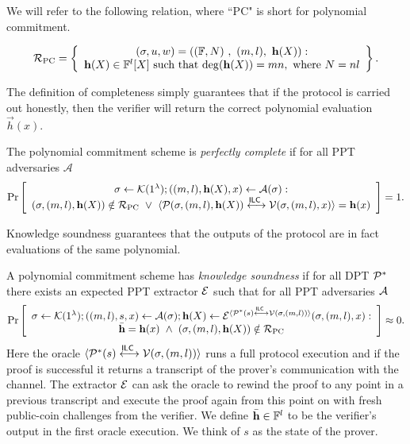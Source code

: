 We will refer to the following relation, where ``PC" is short for polynomial commitment.

$$\mathcal{R}_{\textnormal{PC}}=\left\{\begin{array}{c}
(\mathsf{\sigma},u,w)=\left( (\mathbb{F},N)\ , \  (m,l) , \ \mathbf{h}(X) \right):\\
\mathbf{h}(X) \in \mathbb{F}^l[X] \text{ such that } \mathrm{deg}(\mathbf{h}(X)) = mn, \text{ where } N = nl
\end{array}\right\}.$$

The definition of completeness simply guarantees that if the protocol is carried out honestly, then the verifier will return the correct polynomial evaluation $\vec{h}(x)$.

\begin{definition}
The polynomial commitment scheme is \emph{perfectly complete} if for all PPT adversaries $\mathcal{A}$
$$\Pr \left[ \begin{array}{c} \mathsf{\sigma}\gets \mathcal{K}(1^{\lambda}); ((m,l),\mathbf{h}(X),x) \leftarrow \mathcal{A}(\mathsf{\sigma}): \\
(\mathsf{\sigma},(m,l),\mathbf{h}(X))\notin \mathcal{R}_\mathrm{PC} ~\vee~ \langle \mathcal{P}(\mathsf{\sigma},(m,l),\mathbf{h}(X))\overset{\mathsf{ILC}~}{\longleftrightarrow}\mathcal{V}(\mathsf{\sigma},(m,l),x)\rangle= \mathbf{h}(x) \end{array}\right] =1.$$
\end{definition}

Knowledge soundness guarantees that the outputs of the protocol are in fact evaluations of the same polynomial.

\begin{definition}
A polynomial commitment scheme has \emph{knowledge soundness} if for all DPT $\mathcal{P}^*$ there exists an expected PPT extractor $\mathcal{E}$ such that for all PPT adversaries $\mathcal{A}$
$$\Pr\left[\begin{array}{c} \mathsf{\sigma}\gets \mathcal{K}(1^{\lambda});((m,l),s,x) \gets \mathcal{A}(\mathsf{\sigma}); \mathbf{h}(X) \gets \mathcal{E}^{\langle \mathcal{P}^*(s)\overset{\mathsf{ILC}~}{\longleftrightarrow}\mathcal{V}(\mathsf{\sigma},(m,l))\rangle}(\mathsf{\sigma},(m,l),x):\\ \bar{\mathbf{h}} = \mathbf{h}(x) ~\wedge~ (\mathsf{\sigma},(m,l),\mathbf{h}(X))\notin \mathcal{R}_\mathrm{PC} \end{array}\right]\approx 0.$$ 
Here the oracle $\langle \mathcal{P}^*(s)\overset{\mathsf{ILC}~}{\longleftrightarrow}\mathcal{V}(\mathsf{\sigma},(m,l))\rangle$ runs a full protocol execution and if the proof is successful it returns a transcript of the prover's communication with the channel. The extractor $\mathcal{E}$ can ask the oracle to rewind the proof to any point in a previous transcript and execute the proof again from this point on with fresh public-coin challenges from the verifier. We define $\bar{\mathbf{h}} \in \mathbb{F}^l$ to be the verifier's output in the first oracle execution. We think of $s$ as the state of the prover.
\end{definition}


